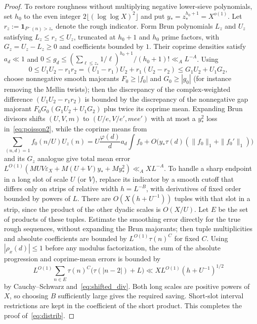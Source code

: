 \documentclass[11pt,reqno]{amsart}
\theoremstyle{remark}
\newcommand{\ind}{\mathbf{1}}
\numberwithin{equation}{section}
\begin{document}
\begin{proof}
To restore roughness without multiplying negative lower-sieve polynomials, set $h_0$ to the even integer $2\lfloor(\log\log X)^2\rfloor$ and put $y_* = z_*^{h_0+1} = X^{o(1)}$. Let $r_z := \ind_{P^-(n)>z_*}$ denote the rough indicator. Form Brun polynomials $L_z$ and $U_z$ satisfying $L_z \le r_z \le U_z$, truncated at $h_0+1$ and $h_0$ prime factors, with $G_z = U_z - L_z \ge 0$ and coefficients bounded by $1$. Their coprime densities satisfy $a_d \ll 1$ and $0 \le g_d \le (\sum_{\ell \le z_*} 1/\ell)^{h_0+1}/(h_0+1)! \ll_A L^{-A}$. Using
\begin{equation}\label{eq:brun_diff}
0 \le U_1 U_2 - r_1 r_2 = (U_1 - r_1)U_2 + r_1(U_2 - r_2) \le G_1 U_2 + U_1 G_2,
\end{equation}
choose nonnegative smooth majorants $F_0\ge|f_0|$ and $G_0\ge|g_0|$ (for instance removing the Mellin twists); then the discrepancy of the complex-weighted difference $(U_1 U_2 - r_1 r_2)$ is bounded by the discrepancy of the nonnegative gap majorant $F_0 G_0 (G_1 U_2 + U_1 G_2)$ plus twice its coprime mean. Expanding Brun divisors shifts $(U,V,m)$ to $(U/e, V/e', mee')$ with at most a $y_*^2$ loss in~\eqref{eq:poisson2}, while the coprime means from
\[
\sum_{(n,d)=1} f_0(n/U) U_z(n) = U\frac{\varphi(d)}{d}a_d\int f_0 + O\bigl(y_*\tau(d)(\|f_0\|_1 + \|f_0'\|_1)\bigr)
\]
and its $G_z$ analogue give total mean error $L^{O(1)}(MUV\varepsilon_X + M(U+V)y_* + My_*^2) \ll_A XL^{-A}$. To handle a sharp endpoint in a long slot of scale $U$ (or $V$), replace its indicator by a smooth cutoff that differs only on strips of relative width $h=L^{-B}$, with derivatives of fixed order bounded by powers of $L$. There are $O(X(h+U^{-1}))$ tuples with that slot in a strip, since the product of the other dyadic scales is $O(X/U)$. Let $E$ be the set of products of these tuples. Estimate the smoothing error directly for the true rough sequences, without expanding the Brun majorants; then tuple multiplicities and absolute coefficients are bounded by $L^{O(1)}\tau(n)^C$ for fixed $C$. Using $|\rho_x(d)|\le1$ before any modulus factorization, the sum of the absolute progression and coprime-mean errors is bounded by
\[
L^{O(1)}\sum_{n\in E}\tau(n)^C\bigl(\tau(|n-2|)+L\bigr)
\ll X L^{O(1)}(h+U^{-1})^{1/2}
\]
by Cauchy--Schwarz and~\eqref{eq:shifted_div}. Both long scales are positive powers of $X$, so choosing $B$ sufficiently large gives the required saving. Short-slot interval restrictions are kept in the coefficient of the short product. This completes the proof of~\eqref{eq:distrib}.
\end{proof}
\end{document}
